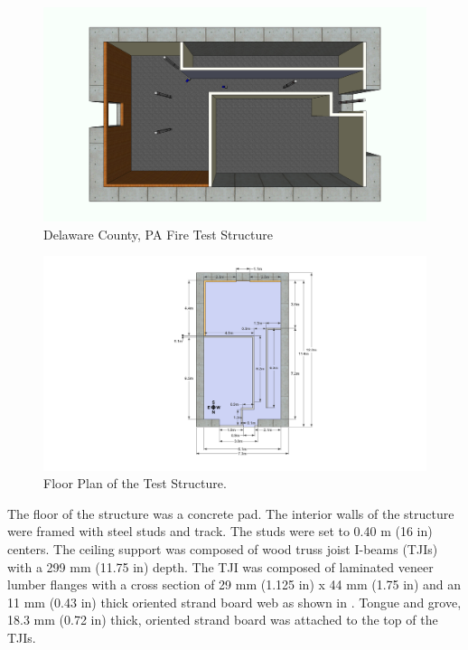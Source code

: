 \documentclass[12pt,oneside]{book}
\begin{document}
\begin{figure}[!ht]
	\includegraphics[width=6in]{../Figures/Pictures/DelCoSingleStory}
	\caption{Delaware County, PA Fire Test Structure}
	\label{fig:DelCoSingleStory}
\end{figure}

\begin{figure}[!ht]
	\includegraphics[width=6in]{../Figures/Pictures/DelCoSingleStoryDimensionsMetric}
	\caption{Floor Plan of the Test Structure.}
	\label{fig:Test_Structure_Floor_Plan}
\end{figure}
    
The floor of the structure was a concrete pad.  The interior walls of the structure were framed with steel studs and track.  The studs were set to 0.40 m (16 in) centers.  The ceiling support was composed of wood truss joist I-beams (TJIs) with a 299 mm (11.75 in) depth.  The TJI was composed of laminated veneer lumber flanges with a cross section of 29 mm (1.125 in) x 44 mm (1.75 in) and an 11 mm (0.43 in) thick oriented strand board web as shown in .  Tongue and grove, 18.3 mm (0.72 in) thick, oriented strand board was attached to the top of the TJIs.     
\end{document}
